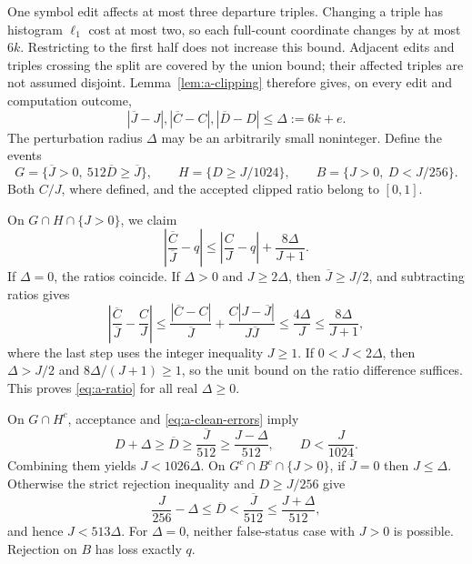One symbol edit affects at most three departure triples.  Changing a
triple has histogram $\ell_1$ cost at most two, so each full-count
coordinate changes by at most $6k$.  Restricting to the first half does
not increase this bound.  Adjacent edits and triples crossing the split
are covered by the union bound; their affected triples are not assumed
disjoint.  Lemma~\ref{lem:a-clipping} therefore gives, on every edit and
computation outcome,
\begin{equation}\label{eq:a-clean-errors}
 |\overline J-J|,
 |\overline C-C|,
 |\overline D-D|\le\Delta:=6k+e.
\end{equation}
The perturbation radius $\Delta$ may be an arbitrarily small noninteger.
Define the events
\[
 G=\{\overline J>0,\ 512\overline D\ge\overline J\},\qquad
 H=\{D\ge J/1024\},\qquad
 B=\{J>0,\ D<J/256\}.
\]
Both $C/J$, where defined, and the accepted clipped ratio belong to
$[0,1]$.

On $G\cap H\cap\{J>0\}$, we claim
\begin{equation}\label{eq:a-ratio}
 \left|\frac{\overline C}{\overline J}-q\right|
 \le\left|\frac CJ-q\right|+\frac{8\Delta}{J+1}.
\end{equation}
If $\Delta=0$, the ratios coincide.  If $\Delta>0$ and $J\ge2\Delta$,
then $\overline J\ge J/2$, and subtracting ratios gives
\[
 \left|\frac{\overline C}{\overline J}-\frac CJ\right|
 \le\frac{|\overline C-C|}{\overline J}
       +\frac{C|J-\overline J|}{J\overline J}
 \le\frac{4\Delta}{J}
 \le\frac{8\Delta}{J+1},
\]
where the last step uses the integer inequality $J\ge1$.
If $0<J<2\Delta$, then $\Delta>J/2$ and
$8\Delta/(J+1)\ge1$, so the unit bound on the ratio difference suffices.
This proves \eqref{eq:a-ratio} for all real $\Delta\ge0$.

On $G\cap H^c$, acceptance and \eqref{eq:a-clean-errors} imply
\[
 D+\Delta\ge\overline D
 \ge\frac{\overline J}{512}\ge\frac{J-\Delta}{512},
 \qquad D<\frac J{1024}.
\]
Combining them yields $J<1026\Delta$.
On $G^c\cap B^c\cap\{J>0\}$, if $\overline J=0$ then
$J\le\Delta$.  Otherwise the strict rejection inequality and
$D\ge J/256$ give
\[
 \frac J{256}-\Delta
 \le\overline D<\frac{\overline J}{512}
 \le\frac{J+\Delta}{512},
\]
and hence $J<513\Delta$.  For $\Delta=0$, neither false-status case
with $J>0$ is possible.  Rejection on $B$ has loss exactly $q$.

